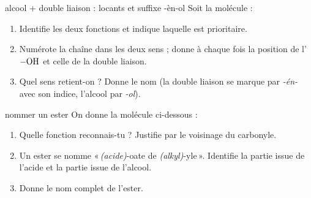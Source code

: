 \documentclass[11pt,a4paper]{article}
\begin{document}
\begin{exo}{alcool + double liaison : locants et suffixe -èn-ol}
Soit la molécule :
\begin{center}\end{center}
\begin{enumerate}[label=\textbf{\alph*)},leftmargin=2em,itemsep=1pt]
  \item Identifie les deux fonctions et indique laquelle est prioritaire.
  \item Numérote la chaîne dans les deux sens ; donne à chaque fois la position de l'$\ce{-OH}$ et celle de la double liaison.
  \item Quel sens retient-on ? Donne le nom (la double liaison se marque par \textit{-én-} avec son indice, l'alcool par \textit{-ol}).
\end{enumerate}
\end{exo}

\begin{exo}{nommer un ester}
On donne la molécule ci-dessous :
\begin{center}\end{center}
\begin{enumerate}[label=\textbf{\alph*)},leftmargin=2em,itemsep=1pt]
  \item Quelle fonction reconnais-tu ? Justifie par le voisinage du carbonyle.
  \item Un ester se nomme «\,\emph{(acide)}-oate de \emph{(alkyl)}-yle\,». Identifie la partie issue de l'acide et la partie issue de l'alcool.
  \item Donne le nom complet de l'ester.
\end{enumerate}
\end{exo}
\end{document}
